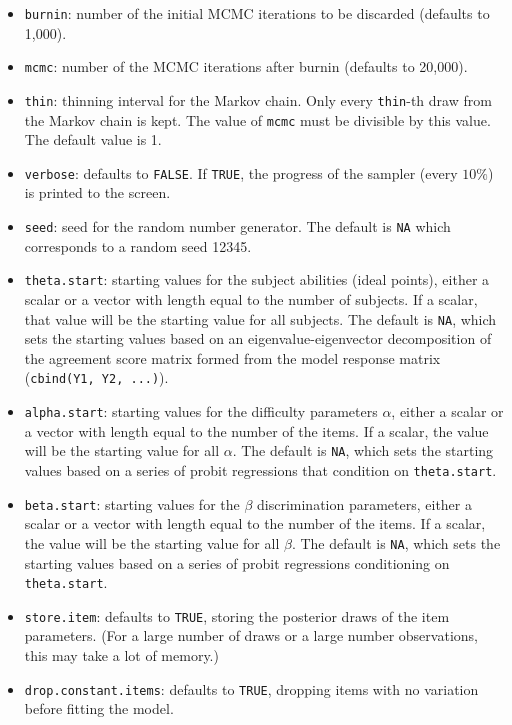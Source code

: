 \begin{itemize}
\item \texttt{burnin}: number of the initial MCMC iterations to be 
 discarded (defaults to 1,000).

\item \texttt{mcmc}: number of the MCMC iterations after burnin
(defaults to 20,000).

\item \texttt{thin}: thinning interval for the Markov chain. Only every 
 \texttt{thin}-th draw from the Markov chain is kept. The value of 
\texttt{mcmc} must be divisible by this value. The default value is 1.

\item \texttt{verbose}: defaults to {\tt FALSE}. If \texttt{TRUE}, the progress 
 of the sampler (every $10\%$) is printed to the screen. 

\item \texttt{seed}: seed for the random number generator. The default
is \texttt{NA} which corresponds to a random seed 12345.

\item \texttt{theta.start}: starting values for the subject abilities
(ideal points), either a scalar or a vector with length equal to the
number of subjects. If a scalar, that value will be the starting value
for all subjects. The default is \texttt{NA}, which sets the starting
values based on an eigenvalue-eigenvector decomposition of the
agreement score matrix formed from the model response matrix
(\texttt{cbind(Y1, Y2, ...)}).

\item \texttt{alpha.start}: starting values for the difficulty
parameters $\alpha$, either a scalar or a vector with length equal to
the number of the items. If a scalar, the value will be the starting
value for all $\alpha$. The default is \texttt{NA}, which sets the
starting values based on a series of probit regressions that condition
on \texttt{theta.start}.

\item \texttt{beta.start}: starting values for the $\beta$ discrimination
parameters, either a scalar or a vector with length equal to the
number of the items. If a scalar, the value will be the starting value
for all $\beta$. The default is \texttt{NA}, which sets the starting
values based on a series of probit regressions conditioning on
\texttt{theta.start}.

\item \texttt{store.item}: defaults to {\tt TRUE}, storing the
posterior draws of the item parameters.  (For a large number of draws or
a large number observations, this may take a lot of memory.)  

\item \texttt{drop.constant.items}: defaults to {\tt TRUE}, dropping
items with no variation before fitting the model.  

\end{itemize}

